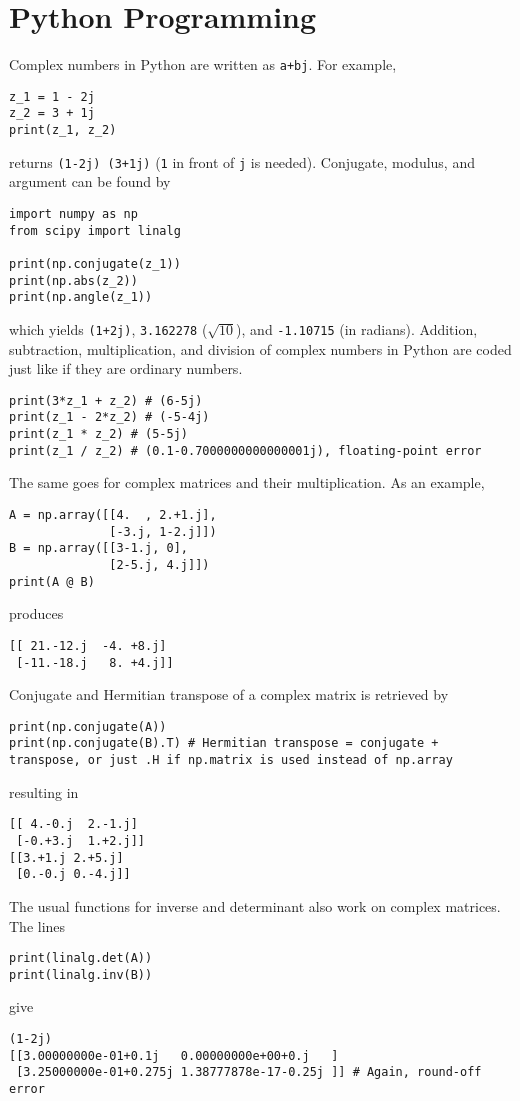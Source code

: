 \section{Python Programming}
Complex numbers in Python are written as \verb|a+bj|. For example,
\begin{lstlisting}
z_1 = 1 - 2j
z_2 = 3 + 1j
print(z_1, z_2)
\end{lstlisting}
returns \verb|(1-2j) (3+1j)| (\texttt{1} in front of \texttt{j} is needed). Conjugate, modulus, and argument can be found by
\begin{lstlisting}
import numpy as np
from scipy import linalg

print(np.conjugate(z_1))
print(np.abs(z_2))    
print(np.angle(z_1))
\end{lstlisting}
which yields \verb|(1+2j)|, \verb|3.162278| ($\sqrt{10}$), and \verb|-1.10715| (in radians). Addition, subtraction, multiplication, and division of complex numbers in Python are coded just like if they are ordinary numbers.
\begin{lstlisting}
print(3*z_1 + z_2) # (6-5j)
print(z_1 - 2*z_2) # (-5-4j)
print(z_1 * z_2) # (5-5j)
print(z_1 / z_2) # (0.1-0.7000000000000001j), floating-point error
\end{lstlisting}
The same goes for complex matrices and their multiplication. As an example,
\begin{lstlisting}
A = np.array([[4.  , 2.+1.j],
              [-3.j, 1-2.j]])
B = np.array([[3-1.j, 0],
              [2-5.j, 4.j]])
print(A @ B)
\end{lstlisting}
produces
\begin{lstlisting}
[[ 21.-12.j  -4. +8.j]
 [-11.-18.j   8. +4.j]]    
\end{lstlisting}
Conjugate and Hermitian transpose of a complex matrix is retrieved by
\begin{lstlisting}
print(np.conjugate(A))
print(np.conjugate(B).T) # Hermitian transpose = conjugate + transpose, or just .H if np.matrix is used instead of np.array
\end{lstlisting}
resulting in
\begin{lstlisting}
[[ 4.-0.j  2.-1.j]
 [-0.+3.j  1.+2.j]]
[[3.+1.j 2.+5.j]
 [0.-0.j 0.-4.j]]
\end{lstlisting}
The usual functions for inverse and determinant also work on complex matrices. The lines
\begin{lstlisting}
print(linalg.det(A))
print(linalg.inv(B))
\end{lstlisting}
give
\begin{lstlisting}
(1-2j)
[[3.00000000e-01+0.1j   0.00000000e+00+0.j   ]
 [3.25000000e-01+0.275j 1.38777878e-17-0.25j ]] # Again, round-off error    
\end{lstlisting}
